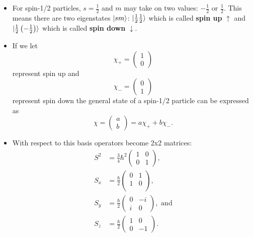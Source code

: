 \documentclass{article}
\begin{document}
\begin{itemize}
  \item For spin-1/2 particles, $s = \frac{1}{2}$ and $m$ may take on two values: $-\frac{1}{2}$ or $\frac{1}{2}$. This means there are two eigenstates $\ket{s m}$: $\ket{\frac{1}{2} \frac{1}{2}}$ which is called \textbf{spin up} $\uparrow$ and $\ket{\frac{1}{2} \left( -\frac{1}{2} \right)}$ which is called \textbf{spin down} $\downarrow$.

  \item If we let \[\chi_+ = \begin{pmatrix}
            1 \\
            0
          \end{pmatrix}\] represent spin up and \[\chi_- = \begin{pmatrix}
            0 \\
            1
          \end{pmatrix}\] represent spin down the general state of a spin-1/2 particle can be expressed as \[\chi = \begin{pmatrix}
            a \\
            b
          \end{pmatrix} = a \chi_+ + b \chi_-.\]

  \item With respect to this basis operators become 2x2 matrices: \begin{align*}
          S^2 & = \frac{3}{4} \hbar^2 \begin{pmatrix}
                                        1 & 0 \\
                                        0 & 1
                                      \end{pmatrix},         \\
          S_x & = \frac{\hbar}{2} \begin{pmatrix}
                                    0 & 1 \\
                                    1 & 0 \\
                                  \end{pmatrix},             \\
          S_y & = \frac{\hbar}{2} \begin{pmatrix}
                                    0 & -i \\
                                    i & 0
                                  \end{pmatrix}, \text{ and} \\
          S_z & = \frac{\hbar}{2} \begin{pmatrix}
                                    1 & 0  \\
                                    0 & -1
                                  \end{pmatrix}.
        \end{align*}


\end{itemize}
\end{document}
